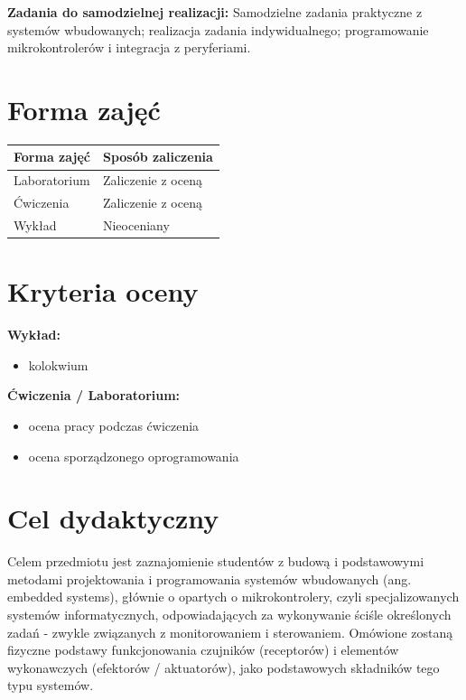 \documentclass[12pt, a4paper]{article}
\newcommand{\thdrule}{\noalign{\global\setlength{\extrarowheight}{0pt}}}
\newcommand{\thdend}{\noalign{\global\setlength{\extrarowheight}{3pt}}}
\begin{document}
\vspace{4pt}
\noindent\textbf{Zadania do samodzielnej realizacji:} Samodzielne zadania praktyczne z systemów wbudowanych; realizacja zadania indywidualnego; programowanie mikrokontrolerów i integracja z peryferiami.

\section{Forma zajęć}

\begin{center}
{\scriptsize
\begin{tabular}{m{5cm}m{8cm}}
\thdrule\toprule
\rowcolor{pjatkRed} {\color{white}\textbf{Forma zajęć}} & {\color{white}\textbf{Sposób zaliczenia}} \\
\midrule\thdend
  \rowcolor{tableRowLight} Laboratorium & Zaliczenie z oceną \\
  \rowcolor{tableRowAlt} Ćwiczenia & Zaliczenie z oceną \\
  \rowcolor{tableRowLight} Wykład & Nieoceniany \\
\bottomrule
\end{tabular}}
\end{center}

\section{Kryteria oceny}

\textbf{Wykład:}
\begin{itemize}
  \item kolokwium
\end{itemize}
\vspace{4pt}
\textbf{Ćwiczenia / Laboratorium:}
\begin{itemize}
  \item ocena pracy podczas ćwiczenia
  \item ocena sporządzonego oprogramowania
\end{itemize}


\section{Cel dydaktyczny}

Celem przedmiotu jest zaznajomienie studentów z budową i podstawowymi metodami projektowania i programowania systemów wbudowanych (ang. embedded systems), głównie o opartych o mikrokontrolery, czyli specjalizowanych systemów informatycznych, odpowiadających za wykonywanie ściśle określonych zadań - zwykle związanych z monitorowaniem i sterowaniem. Omówione zostaną fizyczne podstawy funkcjonowania czujników (receptorów) i elementów wykonawczych (efektorów / aktuatorów), jako podstawowych składników tego typu systemów.
\end{document}
